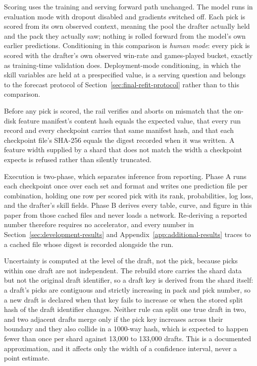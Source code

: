 \documentclass[11pt]{article}
\numberwithin{equation}{section}
\begin{document}
Scoring uses the training and serving forward path unchanged. The model runs in
evaluation mode with dropout disabled and gradients switched off. Each pick is
scored from its own observed context, meaning the pool the drafter actually held
and the pack they actually saw; nothing is rolled forward from the model's own
earlier predictions. Conditioning in this comparison is \emph{human mode}: every
pick is scored with the drafter's own observed win-rate and games-played bucket,
exactly as training-time validation does. Deployment-mode conditioning, in which
the skill variables are held at a prespecified value, is a serving question and
belongs to the forecast protocol of Section~\ref{sec:final-refit-protocol}
rather than to this comparison.

Before any pick is scored, the rail verifies and aborts on mismatch that the
on-disk feature manifest's content hash equals the expected value, that every
run record and every checkpoint carries that same manifest hash, and that each
checkpoint file's SHA-256 equals the digest recorded when it was written. A
feature width supplied by a shard that does not match the width a checkpoint
expects is refused rather than silently truncated.

Execution is two-phase, which separates inference from reporting. Phase A runs
each checkpoint once over each set and format and writes one prediction file per
combination, holding one row per scored pick with its rank, probabilities, log
loss, and the drafter's skill fields. Phase B derives every table, curve, and
figure in this paper from those cached files and never loads a network.
Re-deriving a reported number therefore requires no accelerator, and every
number in Section~\ref{sec:development-results} and
Appendix~\ref{app:additional-results} traces to a cached file whose digest is
recorded alongside the run.

Uncertainty is computed at the level of the draft, not the pick, because picks
within one draft are not independent. The rebuild store carries the shard data
but not the original draft identifier, so a draft key is derived from the shard
itself: a draft's picks are contiguous and strictly increasing in pack and pick
number, so a new draft is declared when that key fails to increase or when the
stored split hash of the draft identifier changes. Neither rule can split one
true draft in two, and two adjacent drafts merge only if the pick key increases
across their boundary and they also collide in a 1000-way hash, which is
expected to happen fewer than once per shard against 13,000 to 133,000 drafts.
This is a documented approximation, and it affects only the width of a
confidence interval, never a point estimate.
\end{document}
